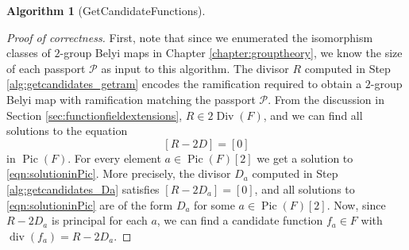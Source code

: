 \documentclass{dcthesis}
\newcommand{\wt}[1]{\widetilde{#1}}
\newcommand{\LL}{\mathscr L}
\DeclareMathOperator{\Div}{Div}
\DeclareMathOperator{\Pic}{Pic}
\DeclareMathOperator{\ddiv}{div}
\DeclareMathOperator{\sat}{sat}
\numberwithin{equation}{section}
\theoremstyle{definition}
\newtheorem{alg}[equation]{Algorithm}
\theoremstyle{remark}
\begin{document}
{{{\begin{alg}[GetCandidateFunctions]
    \end{alg}
    \begin{proof}[Proof of correctness]
      First, note that since
      we enumerated the isomorphism
      classes of $2$-group Belyi maps
      in Chapter \ref{chapter:grouptheory},
      we know the size of each passport
      $\mathcal{P}$ as input to this algorithm.
      The divisor $R$ computed in
      Step \ref{alg:getcandidates_getram}
      encodes the ramification
      required to obtain a $2$-group Belyi map
      with ramification matching the
      passport $\mathcal{P}$.
      From the discussion
      in Section
      \ref{sec:functionfieldextensions},
      $R\in 2\Div(F)$,
      and we can find all solutions to
      the equation
      \begin{equation}
        \label{eqn:solutioninPic}
        [R-2D]=[0]
      \end{equation}
      in $\Pic(F)$.
      For every element $a\in\Pic(F)[2]$
      we get a solution
      to \eqref{eqn:solutioninPic}.
      More precisely, the divisor $D_a$
      computed in Step
      \ref{alg:getcandidates_Da}
      satisfies $[R-2D_a]=[0]$,
      and all solutions to
      \eqref{eqn:solutioninPic}
      are of the form $D_a$
      for some $a\in\Pic(F)[2]$.
      Now,
      since $R-2D_a$ is principal for each $a$,
      we can find a candidate function
      $f_a\in F$ with $\ddiv(f_a) = R-2D_a$.

\end{proof}}}}
\end{document}
